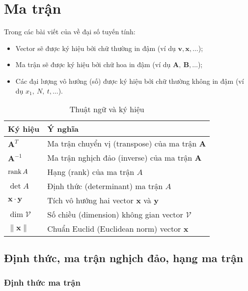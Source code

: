\chapter{Ma trận}

Trong các bài viết của về đại số tuyến tính:

\begin{itemize}
    \item Vector sẽ được ký hiệu bởi chữ thường in đậm (ví dụ $\bm{v}, \bm{x}, \ldots$)​; 
    \item Ma trận sẽ được ký hiệu bởi chữ hoa in đậm (ví dụ $\bm{A},\ \bm{B}, \ldots$​);
    \item Các đại lượng vô hướng (số) được ký hiệu bởi chữ thường không in đậm (ví dụ $x_1,\ N,\ t, \ldots$).
\end{itemize}

\begin{table}[htb]
    \caption{Thuật ngữ và ký hiệu}
    \begin{tabularx}{\textwidth}
        {|>{\raggedright\arraybackslash\hsize=0.2\textwidth}X|>{\raggedright\arraybackslash}X|}
        \hline
        \textbf{Ký hiệu} & \textbf{Ý nghĩa} \\ \hline\hline
        $\bm{A}^T$ & Ma trận chuyển vị (transpose) của ma trận $\bm{A}$ \\ \hline
        $\bm{A}^{-1}$ & Ma trận nghịch đảo (inverse) của ma trận $\bm{A}$ \\ \hline
        $\operatorname{rank} A$ & Hạng (rank) của ma trận $A$ \\ \hline
        $\det A$ & Định thức (determinant) ma trận $A$ \\ \hline
        $\bm{x} \cdot \bm{y}$ & Tích vô hướng hai vector $\bm{x}$ và $\bm{y}$ \\ \hline
        $\dim \mathcal{V}$ & Số chiều (dimension) không gian vector $\mathcal{V}$ \\ \hline
        $\lVert \bm{x} \rVert$ & Chuẩn Euclid (Euclidean norm) vector $\bm{x}$ \\ \hline
    \end{tabularx}
\end{table}

\section{Định thức, ma trận nghịch đảo, hạng ma trận}

\subsection*{Định thức ma trận}

